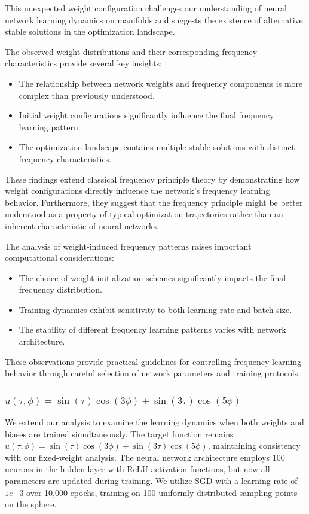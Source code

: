 \documentclass[review,onefignum,onetabnum,onealgnum]{siamart250106}
\numberwithin{theorem}{section}
\begin{document}
This unexpected weight configuration challenges our understanding of neural network learning dynamics on manifolds and suggests the existence of alternative stable solutions in the optimization landscape.


The observed weight distributions and their corresponding frequency characteristics provide several key insights:
\begin{itemize}
    \item The relationship between network weights and frequency components is more complex than previously understood.
    \item Initial weight configurations significantly influence the final frequency learning pattern.
    \item The optimization landscape contains multiple stable solutions with distinct frequency characteristics.
\end{itemize}

These findings extend classical frequency principle theory by demonstrating how weight configurations directly influence the network's frequency learning behavior. Furthermore, they suggest that the frequency principle might be better understood as a property of typical optimization trajectories rather than an inherent characteristic of neural networks.


The analysis of weight-induced frequency patterns raises important computational considerations:
\begin{itemize}
    \item The choice of weight initialization schemes significantly impacts the final frequency distribution.
    \item Training dynamics exhibit sensitivity to both learning rate and batch size.
    \item  The stability of different frequency learning patterns varies with network architecture.
\end{itemize}
These observations provide practical guidelines for controlling frequency learning behavior through careful selection of network parameters and training protocols.


\subsubsection{$u(\tau,\phi) = \sin(\tau)\cos(3\phi) + \sin(3\tau)\cos(5\phi)$}

We extend our analysis to examine the learning dynamics when both weights and biases are trained simultaneously. The target function remains $u(\tau,\phi) = \sin(\tau)\cos(3\phi) + \sin(3\tau)\cos(5\phi)$, maintaining consistency with our fixed-weight analysis. The neural network architecture employs 100 neurons in the hidden layer with ReLU activation functions, but now all parameters are updated during training. We utilize SGD with a learning rate of $1e{-3}$ over 10,000 epochs, training on 100 uniformly distributed sampling points on the sphere.
\end{document}

